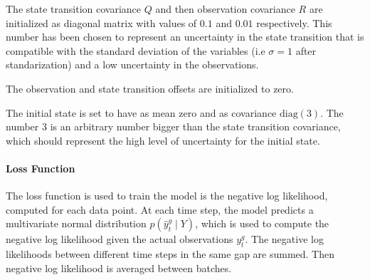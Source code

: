 \documentclass{article}
\begin{document}





The state transition covariance $Q$ and then observation covariance $R$ are initialized as diagonal matrix with values of $0.1$ and $0.01$ respectively. This number has been chosen to represent an uncertainty in the state transition that is compatible with the standard deviation of the variables (i.e $\sigma = 1$ after standarization) and a low uncertainty in the observations. 

The observation and state transition offsets are initialized to zero.

The initial state is set to have as mean zero and as covariance $\text{diag}(3)$. The number 3 is an arbitrary number bigger than the state transition covariance, which should represent the high level of uncertainty for the initial state.  

\paragraph{Loss Function}

The loss function is used to train the model is the negative log likelihood, computed for each data point. At each time step, the model predicts a multivariate normal distribution $p(\hat{y}^g_t \mid Y)$, which is used to compute the negative log likelihood given the actual observations $y_t^g$. The negative log likelihoods between different time steps in the same gap are summed. Then negative log likelihood is averaged between batches.
\end{document}
